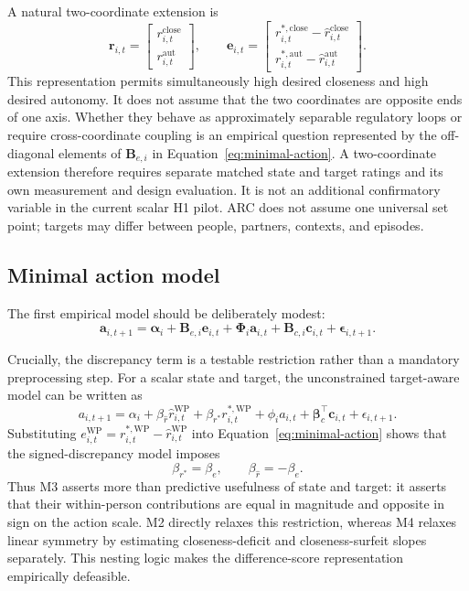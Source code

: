 A natural two-coordinate extension is
\[
\mathbf r_{i,t}=
\begin{bmatrix}
r^{\mathrm{close}}_{i,t}\\
r^{\mathrm{aut}}_{i,t}
\end{bmatrix},
\qquad
\mathbf e_{i,t}=
\begin{bmatrix}
r^{\ast,\mathrm{close}}_{i,t}-\hat r^{\mathrm{close}}_{i,t}\\
r^{\ast,\mathrm{aut}}_{i,t}-\hat r^{\mathrm{aut}}_{i,t}
\end{bmatrix}.
\]
This representation permits simultaneously high desired closeness and high desired autonomy. It does not assume that the two coordinates are opposite ends of one axis. Whether they behave as approximately separable regulatory loops or require cross-coordinate coupling is an empirical question represented by the off-diagonal elements of \(\mathbf B_{e,i}\) in Equation~\ref{eq:minimal-action}. A two-coordinate extension therefore requires separate matched state and target ratings and its own measurement and design evaluation. It is not an additional confirmatory variable in the current scalar H1 pilot. ARC does not assume one universal set point; targets may differ between people, partners, contexts, and episodes.

\subsection{Minimal action model}

The first empirical model should be deliberately modest:
\begin{equation}
\mathbf a_{i,t+1}
=
\boldsymbol{\alpha}_i
+
\mathbf B_{e,i}\mathbf e_{i,t}
+
\mathbf \Phi_i\mathbf a_{i,t}
+
\mathbf B_{c,i}\mathbf c_{i,t}
+
\boldsymbol{\epsilon}_{i,t+1}.
\label{eq:minimal-action}
\end{equation}

Crucially, the discrepancy term is a testable restriction rather than a mandatory preprocessing step. For a scalar state and target, the unconstrained target-aware model can be written as
\begin{equation}
a_{i,t+1}
=
\alpha_i
+
\beta_{\hat r}\hat r^{\mathrm{WP}}_{i,t}
+
\beta_{r^\ast}r^{\ast,\mathrm{WP}}_{i,t}
+
\phi_i a_{i,t}
+
\boldsymbol{\beta}^{\top}_c\mathbf c_{i,t}
+
\epsilon_{i,t+1}.
\label{eq:unconstrained-target-state}
\end{equation}
Substituting \(e^{\mathrm{WP}}_{i,t}=r^{\ast,\mathrm{WP}}_{i,t}-\hat r^{\mathrm{WP}}_{i,t}\) into Equation~\ref{eq:minimal-action} shows that the signed-discrepancy model imposes
\begin{equation}
\beta_{r^\ast}=\beta_e,
\qquad
\beta_{\hat r}=-\beta_e.
\label{eq:discrepancy-restriction}
\end{equation}
Thus M3 asserts more than predictive usefulness of state and target: it asserts that their within-person contributions are equal in magnitude and opposite in sign on the action scale. M2 directly relaxes this restriction, whereas M4 relaxes linear symmetry by estimating closeness-deficit and closeness-surfeit slopes separately. This nesting logic makes the difference-score representation empirically defeasible.

